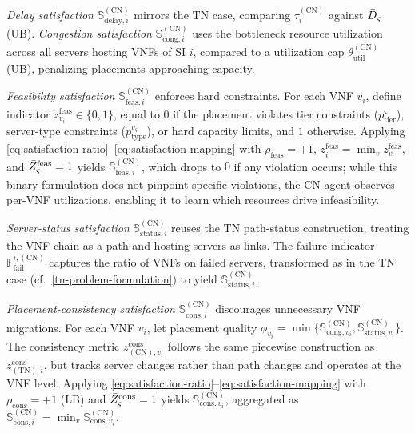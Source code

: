 \documentclass[12pt,lettersize,journal,onecolumn]{IEEEtran}
\begin{document}
\textit{Delay satisfaction} $\mathbb{S}^{\mathrm{(CN)}}_{\mathrm{delay},i}$ mirrors the TN case, comparing $\tau^{\mathrm{(CN)}}_{i}$ against $\Bar{D}_{\varsigma}$ (UB). \textit{Congestion satisfaction} $\mathbb{S}^{\mathrm{(CN)}}_{\mathrm{cong},i}$ uses the bottleneck resource utilization across all servers hosting VNFs of SI $i$, compared to a utilization cap $\theta^{\mathrm{(CN)}}_{\mathrm{util}}$ (UB), penalizing placements approaching capacity.

\textit{Feasibility satisfaction} $\mathbb{S}^{\mathrm{(CN)}}_{\mathrm{feas},i}$ enforces hard constraints. For each VNF $v_{i}$, define indicator $z^{\mathrm{feas}}_{v_{i}}\in\{0,1\}$, equal to $0$ if the placement violates tier constraints ($p^{\varsigma}_{\mathrm{tier}}$), server-type constraints ($p^{v_{\varsigma}}_{\mathrm{type}}$), or hard capacity limits, and $1$ otherwise. Applying \eqref{eq:satisfaction-ratio}--\eqref{eq:satisfaction-mapping} with $\rho_{\mathrm{feas}}=+1$, $z^{\mathrm{feas}}_{i}=\min_{v}z^{\mathrm{feas}}_{v_{i}}$, and $\Bar{Z}^{\mathrm{feas}}_{\varsigma}=1$ yields $\mathbb{S}^{\mathrm{(CN)}}_{\mathrm{feas},i}$, which drops to $0$ if any violation occurs; while this binary formulation does not pinpoint specific violations, the CN agent observes per-VNF utilizations, enabling it to learn which resources drive infeasibility.

\textit{Server-status satisfaction} $\mathbb{S}^{\mathrm{(CN)}}_{\mathrm{status},i}$ reuses the TN path-status construction, treating the VNF chain as a path and hosting servers as links. The failure indicator $\mathbb{F}^{i,\mathrm{(CN)}}_{\mathrm{fail}}$ captures the ratio of VNFs on failed servers, transformed as in the TN case (cf.~\ref{tn-problem-formulation}) to yield $\mathbb{S}^{\mathrm{(CN)}}_{\mathrm{status},i}$.

\textit{Placement-consistency satisfaction} $\mathbb{S}^{\mathrm{(CN)}}_{\mathrm{cons},i}$ discourages unnecessary VNF migrations. For each VNF $v_{i}$, let placement quality $\phi_{v_{i}}=\min\{\mathbb{S}^{\mathrm{(CN)}}_{\mathrm{cong},v_{i}},\mathbb{S}^{\mathrm{(CN)}}_{\mathrm{status},v_{i}}\}$. The consistency metric $z^{\mathrm{cons}}_{\mathrm{(CN)},v_{i}}$ follows the same piecewise construction as $z^{\mathrm{cons}}_{\mathrm{(TN)},i}$, but tracks server changes rather than path changes and operates at the VNF level. Applying \eqref{eq:satisfaction-ratio}--\eqref{eq:satisfaction-mapping} with $\rho_{\mathrm{cons}}=+1$ (LB) and $\Bar{Z}^{\mathrm{cons}}_{\varsigma}=1$ yields $\mathbb{S}^{\mathrm{(CN)}}_{\mathrm{cons},v_{i}}$, aggregated as $\mathbb{S}^{\mathrm{(CN)}}_{\mathrm{cons},i}=\min_{v}\mathbb{S}^{\mathrm{(CN)}}_{\mathrm{cons},v_{i}}$. %
\end{document}
